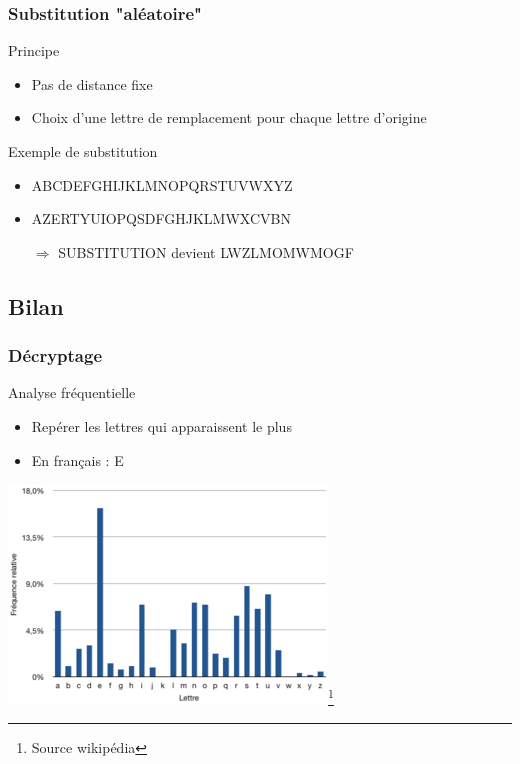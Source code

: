 \documentclass[xcolor={dvipsnames}]{beamer}
\begin{document}
\begin{frame}
	\frametitle{Substitution "aléatoire"}
	
	\begin{block}{Principe}
		\begin{itemize}
			\item Pas de distance fixe
			\item Choix d'une lettre de remplacement pour chaque lettre d'origine
		\end{itemize}
	\end{block}
	
	\begin{exampleblock}{Exemple de substitution}
		\begin{itemize}
			\item ABCDEFGHIJKLMNOPQRSTUVWXYZ
			\item AZERTYUIOPQSDFGHJKLMWXCVBN\pause
			\item []
			\item[$\Rightarrow$] SUBSTITUTION devient LWZLMOMWMOGF
		\end{itemize}
		
		
	\end{exampleblock}
	
	
\end{frame}


\subsection{Bilan}

\begin{frame}
\frametitle{Décryptage}

\begin{block}{Analyse fréquentielle}
	\begin{itemize}
		\item Repérer les lettres qui apparaissent le plus
		\item En français : E
	\end{itemize}
\end{block}

\begin{center}
	\includegraphics[scale=0.6]{freq}\footnote{Source wikipédia}
\end{center}	

\end{frame}
\end{document}
